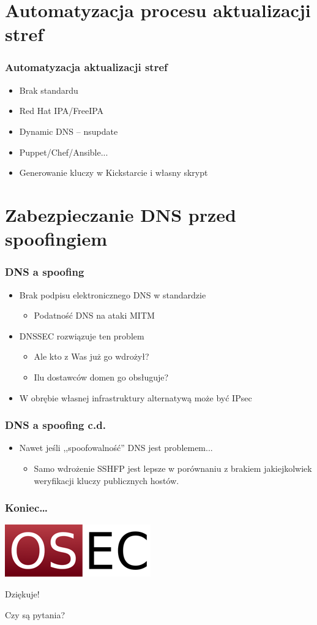 \documentclass[dvipsnames,table]{beamer}
\begin{document}
\section{Automatyzacja procesu aktualizacji stref}

\begin{frame}
\frametitle{Automatyzacja aktualizacji stref}
\begin{itemize}
	\item Brak standardu \Sadey
	\item Red Hat IPA/FreeIPA
	\item Dynamic DNS -- nsupdate
	\item Puppet/Chef/Ansible...
	\item Generowanie kluczy w Kickstarcie i własny skrypt
\end{itemize}
\end{frame}

\section{Zabezpieczanie DNS przed spoofingiem}

\begin{frame}
\frametitle{DNS a spoofing}
\begin{itemize}
	\item Brak podpisu elektronicznego DNS w standardzie \Sadey
	\begin{itemize}
		\item Podatność DNS na ataki MITM
	\end{itemize}
	\item DNSSEC rozwiązuje ten problem
	\begin{itemize}
		\item Ale kto z Was już go wdrożył?
		\item Ilu dostawców domen go obsługuje?
	\end{itemize}
	\item W obrębie własnej infrastruktury alternatywą może być IPsec
\end{itemize}
\end{frame}

\begin{frame}
\frametitle{DNS a spoofing c.d.}
\begin{itemize}
	\item Nawet jeśli ,,spoofowalność'' DNS jest problemem...
	\begin{itemize}
		\item Samo wdrożenie SSHFP jest lepsze w porównaniu z brakiem jakiejkolwiek weryfikacji kluczy publicznych hostów.
	\end{itemize}

\end{itemize}
\end{frame}

\begin{frame}
\frametitle{Koniec\ldots}
\begin{center}
\includegraphics[scale=0.5]{img-oseclogo.png}

Dziękuje!

Czy są pytania?

\end{center}

\end{frame}

 
\end{document}
